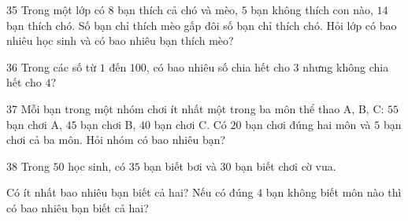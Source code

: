 \gap
\begin{probbox}{35}{}
Trong một lớp có $8$ bạn thích cả chó và mèo, $5$ bạn không thích con nào, $14$ bạn thích chó. Số bạn chỉ thích mèo gấp đôi số bạn chỉ thích chó. Hỏi lớp có bao nhiêu học sinh và có bao nhiêu bạn thích mèo?
\end{probbox}
\gap
\begin{probbox}{36}{}
Trong các số từ $1$ đến $100$, có bao nhiêu số chia hết cho $3$ nhưng không chia hết cho $4$?
\end{probbox}
\gap
\begin{probbox}{37}{}
Mỗi bạn trong một nhóm chơi ít nhất một trong ba môn thể thao A, B, C: $55$ bạn chơi A, $45$ bạn chơi B, $40$ bạn chơi C. Có $20$ bạn chơi đúng hai môn và $5$ bạn chơi cả ba môn. Hỏi nhóm có bao nhiêu bạn?
\end{probbox}
\gap
\begin{probbox}{38}{}
Trong $50$ học sinh, có $35$ bạn biết bơi và $30$ bạn biết chơi cờ vua.\par
{} Có ít nhất bao nhiêu bạn biết cả hai? \quad {} Nếu có đúng $4$ bạn không biết môn nào thì có bao nhiêu bạn biết cả hai?
\end{probbox}

